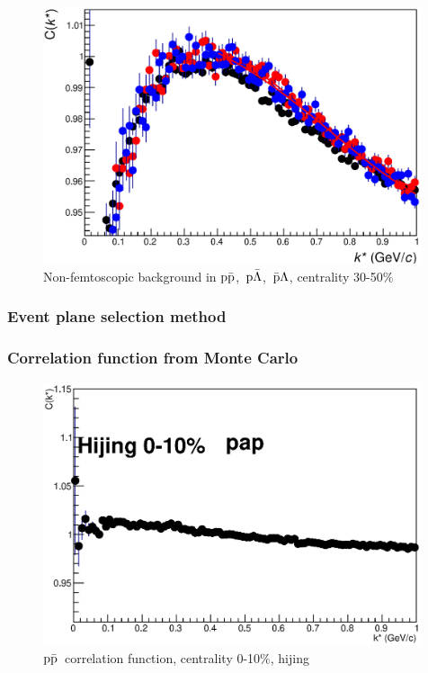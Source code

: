\documentclass[ALICE,manyauthors]{ALICE_analysis_notes}
\newcommand{\pap}{$\rm p\bar{\rm p}$}
\newcommand{\pal}{$\rm p\bar{\rm \Lambda}$}
\newcommand{\apl}{$\bar{\rm p }\Lambda$}
\begin{document}
\begin{figure}[]
   \centering
   \includegraphics[width=0.99\textwidth]{pics/compBack3050}
   \caption{ Non-femtoscopic background in \pap,~\pal,~\apl, centrality 30-50$\%$}
   \label{fig:backCorrFun3050}
 \end{figure}

\subsubsection{Event plane selection method}

\subsubsection{Correlation function from Monte Carlo}

\begin{figure}[]
   \centering
   \includegraphics[width=0.99\textwidth]{pics/hijingpap}
   \caption{ \pap~correlation function, centrality 0-10$\%$, hijing}
   \label{fig:papCorrFunHijng}
 \end{figure}
\end{document}
